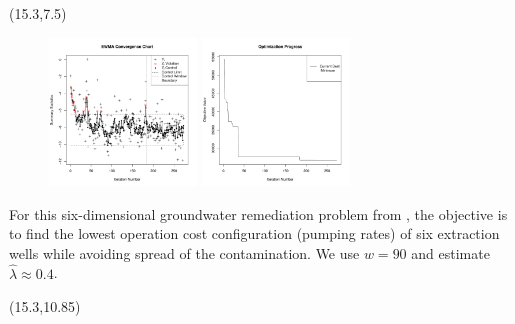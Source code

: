 \documentclass[a0,landscape]{a0poster}
\newcommand{\co}[2]{{{\bf \color{#1}{#2}}}}
\begin{document}
\begin{textblock}{8.8}(15.3,7.5)
\begin{figure}
\includegraphics[width=0.35\textwidth]{./figures/ewmaConvChartLock6Three20000End.pdf}
\includegraphics[width=0.35\textwidth]{./figures/bestZLock6Three20000End.pdf}
\end{figure}

\vspace*{0.05in}
\noindent
\textsc{\co{blue}{\LARGE Lockwood}}

\vspace*{0.06in}
\noindent
\textsc{\co{blue}{\LARGE Case Study}}

\large

\noindent
For this six-dimensional groundwater remediation problem from
\citet{mayer2002optimal}, the objective is 
to find the lowest operation cost configuration
(pumping rates) of six extraction wells while avoiding  
spread of the contamination. 
We use $w=90$ and estimate $\hat\lambda\approx 0.4$.
\end{textblock}

\begin{textblock}{8.8}(15.3,10.85)




\end{textblock}
\end{document}
